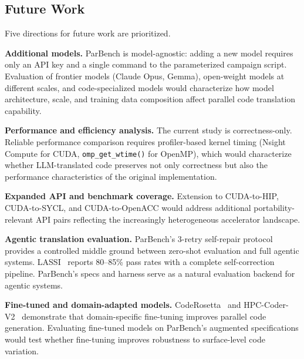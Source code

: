\documentclass[conference]{IEEEtran}
\begin{document}
\subsection{Future Work}

Five directions for future work are prioritized.

\textbf{Additional models.} ParBench is model-agnostic: adding a new model requires only an API key and a single command to the parameterized campaign script. Evaluation of frontier models (Claude Opus, Gemma), open-weight models at different scales, and code-specialized models would characterize how model architecture, scale, and training data composition affect parallel code translation capability.

\textbf{Performance and efficiency analysis.} The current study is correctness-only. Reliable performance comparison requires profiler-based kernel timing (Nsight Compute for CUDA, \texttt{omp\_get\_wtime()} for OpenMP), which would characterize whether LLM-translated code preserves not only correctness but also the performance characteristics of the original implementation.

\textbf{Expanded API and benchmark coverage.} Extension to CUDA-to-HIP, CUDA-to-SYCL, and CUDA-to-OpenACC would address additional portability-relevant API pairs reflecting the increasingly heterogeneous accelerator landscape.

\textbf{Agentic translation evaluation.} ParBench's 3-retry self-repair protocol provides a controlled middle ground between zero-shot evaluation and full agentic systems. LASSI~\cite{LASSI2024} reports 80--85\% pass rates with a complete self-correction pipeline. ParBench's specs and harness serve as a natural evaluation backend for agentic systems.

\textbf{Fine-tuned and domain-adapted models.} CodeRosetta~\cite{CodeRosetta2024} and HPC-Coder-V2~\cite{HPCCoderV2} demonstrate that domain-specific fine-tuning improves parallel code generation. Evaluating fine-tuned models on ParBench's augmented specifications would test whether fine-tuning improves robustness to surface-level code variation.



\balance


\end{document}
